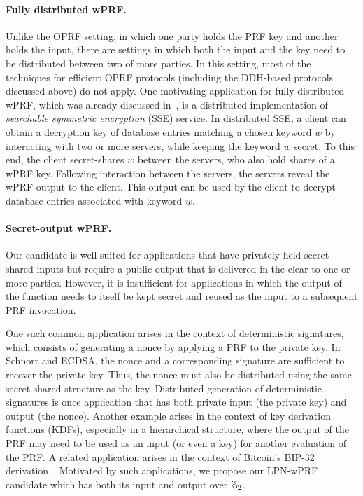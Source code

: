 \paragraph{Fully distributed wPRF.} Unlike the OPRF setting, in which one party holds the PRF key and another holds the input, there are settings in which both the input and the key need to be distributed between two of more parties. In this setting, most of the techniques for efficient OPRF protocols (including the DDH-based protocols discussed above) do not apply.
One motivating application for fully distributed wPRF, which was already discussed in~\cite{boneh2018-darkmatter}, is a distributed implementation of {\em searchable symmetric encryption} (SSE) service. In distributed SSE, a client can obtain a decryption key of database entries matching a chosen keyword $w$ by interacting with two or more servers, while keeping the keyword $w$ secret.  To this end, the client secret-shares $w$ between the servers, who also hold shares of a wPRF key. Following interaction between the servers, the servers reveal the wPRF output to the client. This output can be used by the client to decrypt database entries associated with keyword $w$.

\paragraph{Secret-output wPRF.} Our \ttwPRF candidate is well suited for applications that have privately held secret-shared inputs but require a public output that is delivered in the clear to one or more parties. However, it is insufficient for applications in which the output of the function needs to itself be kept secret and reused as the input to a subsequent PRF invocation.

One such common application arises in the context of deterministic signatures, which consists of generating a nonce by applying a PRF to the private key. In Schnorr and ECDSA, the nonce and a corresponding signature are sufficient to recover the private key. Thus, the nonce must also be distributed using the same secret-shared structure as the key. Distributed generation of deterministic signatures is once application that has both private input (the private key) and output (the nonce). Another example arises in the context of key derivation functions (KDFs), especially in a hierarchical structure, where the output of the PRF may need to be used as an input (or even a key) for another evaluation of the PRF. A related application arises in the context of Bitcoin's BIP-32 derivation~\cite{bitcoin_bip0032}. Motivated by such applications, we propose our LPN-wPRF candidate which has both its input and output over $\mathbb{Z}_2$.

